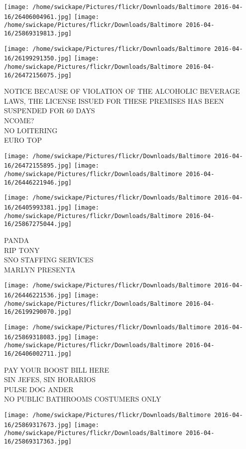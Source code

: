 \documentclass[10pt,letterpaper]{article}
\begin{document}
\texttt{[image: /home/swickape/Pictures/flickr/Downloads/Baltimore 2016-04-16/26406004961.jpg]}
\texttt{[image: /home/swickape/Pictures/flickr/Downloads/Baltimore 2016-04-16/25869319813.jpg]}

\texttt{[image: /home/swickape/Pictures/flickr/Downloads/Baltimore 2016-04-16/26199291350.jpg]}
\texttt{[image: /home/swickape/Pictures/flickr/Downloads/Baltimore 2016-04-16/26472156075.jpg]}

NOTICE BECAUSE OF VIOLATION OF THE ALCOHOLIC BEVERAGE LAWS, THE LICENSE ISSUED FOR THESE PREMISES HAS BEEN SUSPENDED FOR 60 DAYS\\
NCOME?\\
NO LOITERING\\
EURO TOP\\
\pagebreak

\texttt{[image: /home/swickape/Pictures/flickr/Downloads/Baltimore 2016-04-16/26472155895.jpg]}
\texttt{[image: /home/swickape/Pictures/flickr/Downloads/Baltimore 2016-04-16/26446221946.jpg]}

\texttt{[image: /home/swickape/Pictures/flickr/Downloads/Baltimore 2016-04-16/26405993381.jpg]}
\texttt{[image: /home/swickape/Pictures/flickr/Downloads/Baltimore 2016-04-16/25867275044.jpg]}

PANDA\\
RIP TONY\\
SNO STAFFING SERVICES\\
MARLYN PRESENTA\\
\pagebreak

\texttt{[image: /home/swickape/Pictures/flickr/Downloads/Baltimore 2016-04-16/26446221536.jpg]}
\texttt{[image: /home/swickape/Pictures/flickr/Downloads/Baltimore 2016-04-16/26199290070.jpg]}

\texttt{[image: /home/swickape/Pictures/flickr/Downloads/Baltimore 2016-04-16/25869318083.jpg]}
\texttt{[image: /home/swickape/Pictures/flickr/Downloads/Baltimore 2016-04-16/26406002711.jpg]}

PAY YOUR BOOST BILL HERE\\
SIN JEFES, SIN HORARIOS\\
PULSE DOG ANDER\\
NO PUBLIC BATHROOMS COSTUMERS ONLY\\
\pagebreak

\texttt{[image: /home/swickape/Pictures/flickr/Downloads/Baltimore 2016-04-16/25869317673.jpg]}
\texttt{[image: /home/swickape/Pictures/flickr/Downloads/Baltimore 2016-04-16/25869317363.jpg]}
\end{document}
